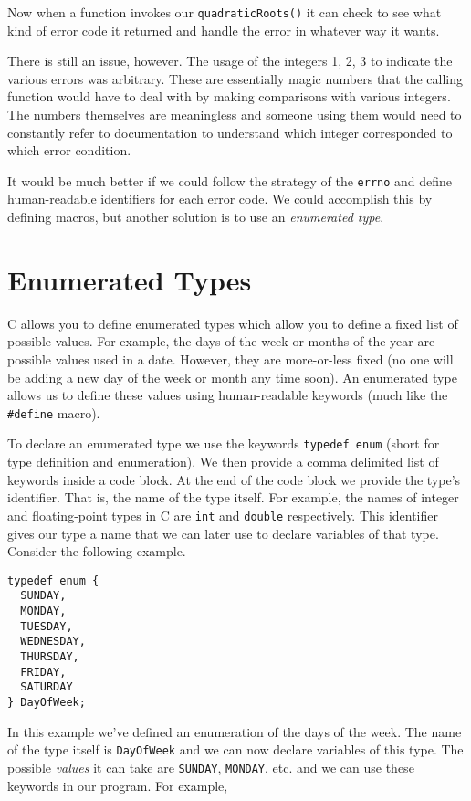 Now when a function invokes our \texttt{quadraticRoots()}
it can check to see what kind of error code it returned and
handle the error in whatever way it wants.  

There is still an issue, however.  The usage of the integers 1, 2, 3
to indicate the various errors was arbitrary.  These are essentially
\glspl{magic number} that the calling function would have to deal
with by making comparisons with various integers.  The numbers
themselves are meaningless and someone using them would 
need to constantly refer to documentation to understand which
integer corresponded to which error condition.

It would be much better if we could follow the strategy of the
\texttt{errno} and define human-readable identifiers 
for each error code.  We could accomplish this by defining
macros, but another solution is to use an \emph{enumerated
type}.

\section{Enumerated Types}

C allows you to define \glspl{enumerated type} which allow you to
define a fixed list of possible values.  For example, the days of the
week or months of the year are possible values used in a date.
However, they are more-or-less fixed (no one will be adding a new
day of the week or month any time soon).  An enumerated type
allows us to define these values using human-readable keywords
(much like the \texttt{#define} macro).  

To declare an enumerated type we use the keywords 
\texttt{typedef enum} (short for type definition
and enumeration).  We then provide a comma delimited
list of keywords inside a code block.  At the end of the
code block we provide the type's identifier.  That is, the
name of the type itself.  For example, the names of 
integer and floating-point types in C are \texttt{int} and 
\texttt{double} respectively.  This identifier gives
our type a name that we can later use to declare variables
of that type.  Consider the following example.

\begin{verbatim}
typedef enum {
  SUNDAY,
  MONDAY,
  TUESDAY,
  WEDNESDAY,
  THURSDAY,
  FRIDAY,
  SATURDAY
} DayOfWeek;
\end{verbatim}

In this example we've defined an enumeration of the days 
of the week.  The name of the type itself is \texttt{DayOfWeek}
and we can now declare variables of this type.  The possible 
\emph{values} it can take are \texttt{SUNDAY}, 
\texttt{MONDAY}, etc. and we can use these keywords 
in our program.  For example, 

